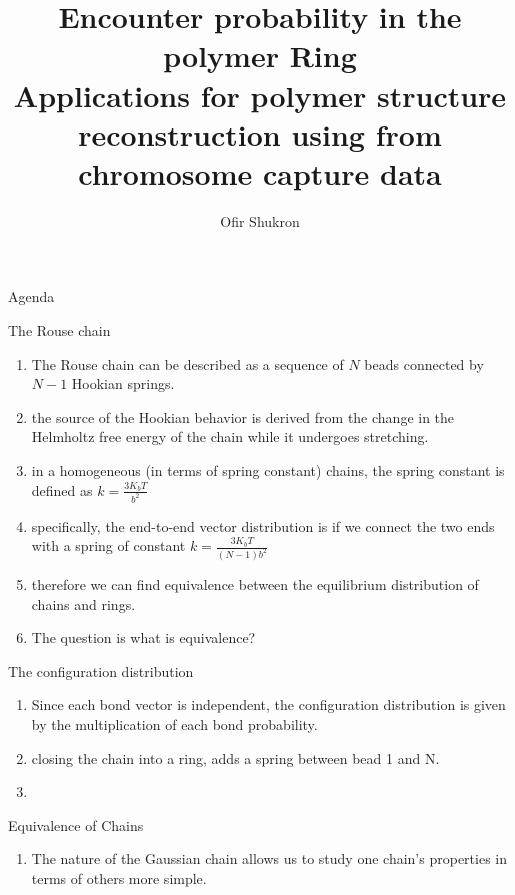 \documentclass[8pt]{beamer}
\title{Encounter probability in the polymer Ring\\
Applications for polymer structure reconstruction using from chromosome capture data}
\author{Ofir Shukron}
\begin{document}
\begin{frame}
\titlepage
\end{frame}

\begin{frame}{Agenda}

\end{frame}

\begin{frame}{The Rouse chain}
\begin{enumerate}
\item The Rouse chain can be described as a sequence of $N$ beads connected by $N-1$ Hookian springs. 
\item the source of the Hookian behavior is derived from the change in the Helmholtz free energy of the chain while it undergoes stretching. 
\item in a homogeneous (in terms of spring constant) chains, the spring constant is defined as 
$k=\frac{3K_bT}{b^2}$
\item specifically, the end-to-end vector distribution is if we connect the two ends with a spring of constant $k=\frac{3K_bT}{(N-1)b^2}$
\item therefore we can find equivalence between the equilibrium distribution of chains and rings. 
\item The question is what is equivalence?
\end{enumerate}
\end{frame}

\begin{frame}{The configuration distribution}
\begin{enumerate}
\item Since each bond vector is independent, the configuration distribution is given by the multiplication of each bond probability.
\item closing the chain into a ring, adds a spring between bead 1 and N. 
\item 
\end{enumerate}

\end{frame}

\begin{frame}{Equivalence of Chains}
\begin{enumerate}
\item The nature of the Gaussian chain allows us to study one chain's properties in terms of others more simple.
\end{enumerate}

\end{frame}
\end{document}
